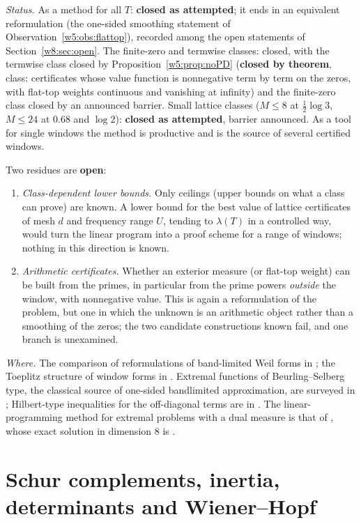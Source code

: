 \documentclass[11pt]{amsart}
\theoremstyle{definition}
\theoremstyle{remark}
\numberwithin{equation}{section}
\newcommand{\lam}{\lambda(T)}                          %
\newcommand{\rtag}[1]{\textbf{\small\textsf{#1}}}
\newcommand{\closedT}{\rtag{closed by theorem}}
\newcommand{\closedA}{\rtag{closed as attempted}}
\newcommand{\openR}{\rtag{open}}
\newcommand{\entry}[1]{\par\smallskip\noindent\textit{#1.}\enspace}
\begin{document}
\entry{Status} As a method for all $T$: \closedA; it ends in an equivalent reformulation (the one-sided smoothing statement
of Observation~\ref{w5:obs:flattop}), recorded among the open statements of Section~\ref{w8:sec:open}. The finite-zero and
termwise classes: closed, with the termwise class closed by Proposition~\ref{w5:prop:noPD} (\closedT, class: certificates
whose value function is nonnegative term by term on the zeros, with flat-top weights continuous and vanishing at
infinity) and the
finite-zero class closed by an announced barrier. Small lattice classes ($M\le8$ at $\frac12\log3$, $M\le24$ at $0.68$
and $\log2$): \closedA, barrier announced. As a tool for single windows the method is productive and is the source of
several certified windows.

Two residues are \openR:
\begin{enumerate}[label=(\alph*)]
\item \emph{Class-dependent lower bounds.} Only ceilings (upper bounds on what a class can prove) are known. A lower bound
for the best value of lattice certificates of mesh $d$ and frequency range $U$, tending to $\lam$ in a controlled way,
would turn the linear program into a proof scheme for a range of windows; nothing in this direction is known.
\item \emph{Arithmetic certificates.} Whether an exterior measure (or flat-top weight) can be built from the primes, in
particular from the prime powers \emph{outside} the window, with nonnegative value. This is again a reformulation of the
problem, but one in which the unknown is an arithmetic object rather than a smoothing of the zeros; the two candidate
constructions known fail, and one branch is unexamined.
\end{enumerate}

\entry{Where} The comparison of reformulations of band-limited Weil forms in \cite{P12}; the Toeplitz structure of window
forms in \cite{P26}. Extremal functions of Beurling--Selberg type, the classical source of one-sided bandlimited
approximation, are surveyed in \cite{Vaaler1985}; Hilbert-type inequalities for the off-diagonal terms are in
\cite{MontgomeryVaughan1974}. The linear-programming method for extremal problems with a dual measure is that of
\cite{CohnElkies2003}, whose exact solution in dimension $8$ is \cite{Viazovska2017}.


\section{Schur complements, inertia, determinants and Wiener--Hopf}\label{w5:sec:schur}
\end{document}
